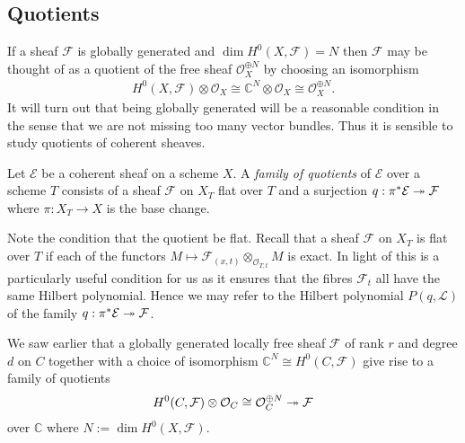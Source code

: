 \documentclass[12pt]{ociamthesis}  %
\begin{document}
\subsection{Quotients}

If a sheaf $\mathcal F$ is globally generated and
$\dim H^0(X,\mathcal F) = N$ then $\mathcal F$ may be thought
of as a quotient of the free sheaf $\mathcal O_X^{\oplus N}$
by choosing an isomorphism
\begin{align*}
  H^0(X,\mathcal F) \otimes \mathcal O_X \cong \mathbb{C}^N \otimes \mathcal O_X \cong \mathcal O_X^{\oplus N}.
\end{align*}
It will turn out that being globally generated will be a reasonable
condition in the sense that we are not missing too many vector
bundles. Thus it is sensible to study quotients of coherent sheaves.

\begin{definition}
  Let $\mathcal E$ be a coherent sheaf on a scheme $X$.
  A \emph{family of quotients} of $\mathcal E$ over a scheme $T$
  consists of a sheaf $\mathcal F$ on $X_T$ flat over $T$ and a
  surjection $q:\pi^*\mathcal E\twoheadrightarrow\mathcal F$ where
  $\pi : X_T \to X$ is the base change.
\end{definition}

Note the condition that the quotient be flat. Recall that a sheaf
$\mathcal F$ on $X_T$ is flat over $T$ if each of the functors
$M \mapsto \mathcal F_{(x,t)} \otimes_{\mathcal O_{T,t}} M$ is exact.
In light of \cite[III Theorem 9.9]{hartshorne1977} this is a
particularly useful condition for us as it ensures that the fibres
$\mathcal F_t$ all have the same Hilbert polynomial. Hence we may
refer to the Hilbert polynomial $P(q,\mathcal L)$ of the family
$q:\pi^*\mathcal E\twoheadrightarrow\mathcal F$.

\begin{example}
  We saw earlier that a globally generated locally free sheaf
  $\mathcal F$ of rank $r$ and degree $d$ on $C$ together with
  a choice of isomorphism $\mathbb{C}^N \cong H^0(C,\mathcal F)$
  give rise to a family of quotients
  \begin{align*}
    H^0(C,\mathcal F)\otimes\mathcal O_C \cong \mathcal O^{\oplus N}_C
    \twoheadrightarrow \mathcal F
  \end{align*}
  over $\mathbb{C}$ where $N := \dim H^0(X,\mathcal F)$.
\end{example}
\end{document}

